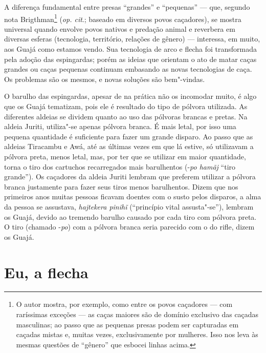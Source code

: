 A diferença fundamental entre presas ``grandes'' e ``pequenas'' --- que,
segundo nota Brigthman\footnote{O autor mostra, por exemplo, como entre
  os povos caçadores --- com raríssimas exceções --- as caças maiores são de
  domínio exclusivo das caçadas masculinas; ao passo que as pequenas
  presas podem ser capturadas em caçadas mistas e, muitas vezes,
  exclusivamente por mulheres. Isso nos leva às mesmas questões de
  ``gênero'' que esbocei linhas acima.} (\emph{op. cit}.; baseado em diversos
povos caçadores), se mostra universal quando envolve povos nativos e
predação animal e reverbera em diversas esferas (tecnologia, território,
relações de gênero) --- interessa, em muito, aos Guajá como estamos vendo.
Sua tecnologia de arco e flecha foi transformada pela adoção das
espingardas; porém as ideias que orientam o ato de matar caças grandes
ou caças pequenas continuam embasando as novas tecnologias de caça. Os
problemas são os mesmos, e novas soluções são bem"-vindas.

O barulho das espingardas, apesar de na prática não os incomodar muito,
é algo que os Guajá tematizam, pois ele é resultado do tipo de pólvora
utilizada. As diferentes aldeias se dividem quanto ao uso das pólvoras
brancas e pretas. Na aldeia Juriti, utiliza"-se apenas pólvora branca. É
mais letal, por isso uma pequena quantidade é suficiente para fazer um
grande disparo. Ao passo que as aldeias Tiracambu e Awá, até as
últimas vezes em que lá estive, só utilizavam a pólvora preta, menos
letal, mas, por ter que se utilizar em maior quantidade, torna o tiro
dos cartuchos recarregados mais barulhentos (-\emph{po hamãj} ``tiro
grande''). Os caçadores da aldeia Juriti lembram que preferem utilizar a
pólvora branca justamente para fazer seus tiros menos barulhentos. Dizem
que nos primeiros anos muitas pessoas ficavam doentes com o susto pelos
disparos, a alma da pessoa se assustava, \emph{hajtekera pinihĩ}
(``princípio vital assusta"-se''), lembram os Guajá, devido ao tremendo
barulho causado por cada tiro com pólvora preta. O tiro (chamado
-\emph{po}) com a pólvora branca seria parecido com o do rifle, dizem os
Guajá.

\section{Eu, a flecha}


